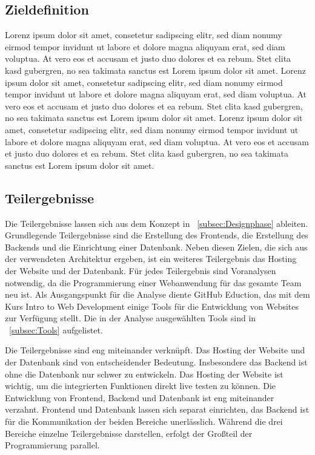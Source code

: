 \subsection{Zieldefinition}\label{subsec:Zieldefinition}
Lorenz ipsum dolor sit amet, consetetur sadipscing elitr, sed diam nonumy eirmod tempor invidunt ut labore et dolore magna aliquyam erat, sed diam voluptua.
At vero eos et accusam et justo duo dolores et ea rebum.
Stet clita kasd gubergren, no sea takimata sanctus est Lorem ipsum dolor sit amet.
Lorenz ipsum dolor sit amet, consetetur sadipscing elitr, sed diam nonumy eirmod tempor invidunt ut labore et dolore magna aliquyam erat, sed diam voluptua.
At vero eos et accusam et justo duo dolores et ea rebum.
Stet clita kasd gubergren, no sea takimata sanctus est Lorem ipsum dolor sit amet.
Lorenz ipsum dolor sit amet, consetetur sadipscing elitr, sed diam nonumy eirmod tempor invidunt ut labore et dolore magna aliquyam erat, sed diam voluptua.
At vero eos et accusam et justo duo dolores et ea rebum.
Stet clita kasd gubergren, no sea takimata sanctus est Lorem ipsum dolor sit amet.

\subsection{Teilergebnisse}\label{subsec:Teilergebnisses}
Die Teilergebnisse lassen sich aus dem Konzept in ~\ref{subsec:Designphase} ableiten.
Grundlegende Teilergebnisse sind die Erstellung des Frontends, die Erstellung des Backends und die Einrichtung einer Datenbank.
Neben diesen Zielen, die sich aus der verwendeten Architektur ergeben, ist ein weiteres Teilergebnis das Hosting der Website und der Datenbank.
Für jedes Teilergebnis sind Voranalysen notwendig, da die Programmierung einer Webanwendung für das gesamte Team neu ist.
Als Ausgangspunkt für die Analyse diente GitHub Eduction, das mit dem Kurs Intro to Web Development einige Tools für die Entwicklung von Websites zur Verfügung stellt.
Die in der Analyse ausgewählten Tools sind in ~\ref{subsec:Tools} aufgelistet.

Die Teilergebnisse sind eng miteinander verknüpft.
Das Hosting der Website und der Datenbank sind von entscheidender Bedeutung.
Insbesondere das Backend ist ohne die Datenbank nur schwer zu entwickeln.
Das Hosting der Website ist wichtig, um die integrierten Funktionen direkt live testen zu können.
Die Entwicklung von Frontend, Backend und Datenbank ist eng miteinander verzahnt.
Frontend und Datenbank lassen sich separat einrichten, das Backend ist für die Kommunikation der beiden Bereiche unerlässlich.
Während die drei Bereiche einzelne Teilergebnisse darstellen, erfolgt der Großteil der Programmierung parallel.

